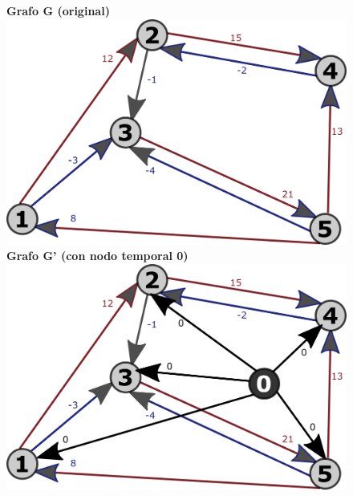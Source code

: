 \documentclass[../tp2_grupo404.tex]{subfiles}
\begin{document}
\begin{figure}[H]
    \centering
    \subcaptionbox
        {\label{fig:grafoG}\textbf{Grafo G (original)}}
        {\includegraphics[width=0.4\linewidth,angle=0,origin=c]{out/ford/ford1A.png}}
    \subcaptionbox
        {\label{fig:grafoG_prima}\textbf{Grafo G' (con nodo temporal 0)}}
        {\includegraphics[width=0.4\linewidth,angle=0,origin=c]{out/ford/ford1B.png}}
\end{figure}
\end{document}
